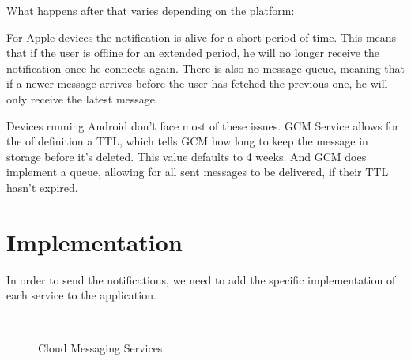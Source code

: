 What happens after that varies depending on the platform:

For Apple devices the notification is alive for a short period of time. This means that if the user is offline for an extended period, he will no longer receive the notification once he connects again. There is also no message queue, meaning that if a newer message arrives before the user has fetched the previous one, he will only receive the latest message.

Devices running Android don't face most of these issues. \ac{GCM} Service allows for the of definition a \ac{TTL}, which tells GCM how long to keep the message in storage before it's deleted. This value defaults to 4 weeks. And GCM does implement a queue, allowing for all sent messages to be delivered, if their \ac{TTL} hasn't expired.

\section{Implementation} 

In order to send the notifications, we need to add the specific implementation of each service to the application. 
\begin{figure}[bth]
        \myfloatalign
         \quad
         \\
        \caption[Cloud Messaging Services]{Cloud Messaging Services\footnotemark}\label{fig:push}
\end{figure}

